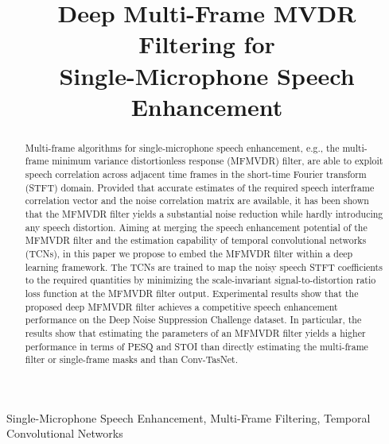 \documentclass{article}
\title{Deep Multi-Frame MVDR Filtering for\\
	Single-Microphone Speech Enhancement}
\begin{document}
\ninept
\maketitle
\begin{abstract}
	Multi-frame algorithms for single-microphone speech enhancement, e.g., the multi-frame minimum variance distortionless response (MFMVDR) filter, are able to exploit speech correlation across adjacent time frames in the short-time Fourier transform (STFT) domain.
	Provided that accurate estimates of the required speech interframe correlation vector and the noise correlation matrix are available, it has been shown that the MFMVDR filter yields a substantial noise reduction while hardly introducing any speech distortion.
	Aiming at merging the speech enhancement potential of the MFMVDR filter and the estimation capability of temporal convolutional networks (TCNs), in this paper we propose to embed the MFMVDR filter within a deep learning framework.
	The TCNs are trained to map the noisy speech STFT coefficients to the required quantities by minimizing the scale-invariant signal-to-distortion ratio loss function at the MFMVDR filter output.
	Experimental results show that the proposed deep MFMVDR filter achieves a competitive speech enhancement performance on the Deep Noise Suppression Challenge dataset.
	In particular, the results show that estimating the parameters of an MFMVDR filter yields a higher performance in terms of PESQ and STOI than directly estimating the multi-frame filter or single-frame masks and than Conv-TasNet.
\end{abstract}
\begin{keywords}
	Single-Microphone Speech Enhancement, Multi-Frame Filtering, Temporal Convolutional Networks
\end{keywords}
\end{document}
